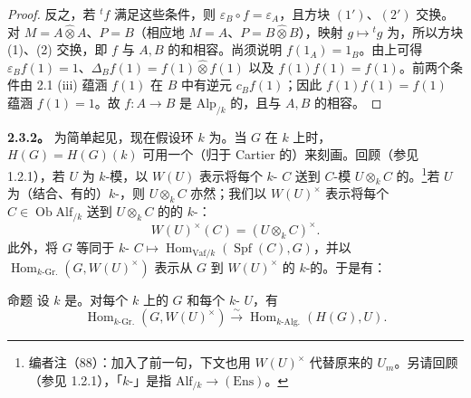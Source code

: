 \begin{proof}
反之，若 ${}^tf$ 满足这些条件，则 $\varepsilon_B\circ f=\varepsilon_A$，且方块 $(1')$、$(2')$ 交换。对 $M=A\widehat\otimes A$、$P=B$（相应地 $M=A$、$P=B\widehat\otimes B$），映射 $g\mapsto{}^tg$ 为，所以方块 (1)、(2) 交换，即 $f$ 与 $A,B$ 的和相容。尚须说明 $f(1_A)=1_B$。由上可得 $\varepsilon_Bf(1)=1$、$\Delta_Bf(1)=f(1)\widehat\otimes f(1)$ 以及 $f(1)f(1)=f(1)$。前两个条件由 2.1 (iii) 蕴涵 $f(1)$ 在 $B$ 中有逆元 $c_Bf(1)$；因此 $f(1)f(1)=f(1)$ 蕴涵 $f(1)=1$。故 $f:A\to B$ 是 $\mathrm{Alp}_{/k}$ 的，且与 $A,B$ 的相容。
\end{proof}

\textbf{2.3.2。} 为简单起见，现在假设环 $k$ 为。当 $G$ 在 $k$ 上时， $H(G)=H(G)(k)$ 可用一个（归于 Cartier 的）来刻画。回顾（参见 1.2.1），若 $U$ 为 $k$-模，以 $W(U)$ 表示将每个 $k$- $C$ 送到 $C$-模 $U\otimes_k C$ 的。\footnote{编者注（88）：加入了前一句，下文也用 $W(U)^\times$ 代替原来的 $U_m$。另请回顾（参见 1.2.1），「$k$-」是指 $\mathrm{Alf}_{/k}\to(\mathrm{Ens})$。}若 $U$ 为（结合、有的）$k$-，则 $U\otimes_k C$ 亦然；我们以 $W(U)^\times$ 表示将每个 $C\in\operatorname{Ob}\mathrm{Alf}_{/k}$ 送到 $U\otimes_k C$ 的的 $k$-：
\[
W(U)^\times(C)=(U\otimes_k C)^\times.
\]
此外，将 $G$ 等同于 $k$- $C\mapsto\operatorname{Hom}_{\mathrm{Vaf}/k}(\operatorname{Spf}(C),G)$，并以 $\operatorname{Hom}_{k\text{-}\mathrm{Gr.}}(G,W(U)^\times)$ 表示从 $G$ 到 $W(U)^\times$ 的 $k$-的。于是有：
\begin{SGAresult}{命题}{}
设 $k$ 是。对每个 $k$ 上的 $G$ 和每个 $k$- $U$，有
\[
\operatorname{Hom}_{k\text{-}\mathrm{Gr.}}(G,W(U)^\times)\xrightarrow{\sim}\operatorname{Hom}_{k\text{-}\mathrm{Alg.}}(H(G),U).
\]
\end{SGAresult}
